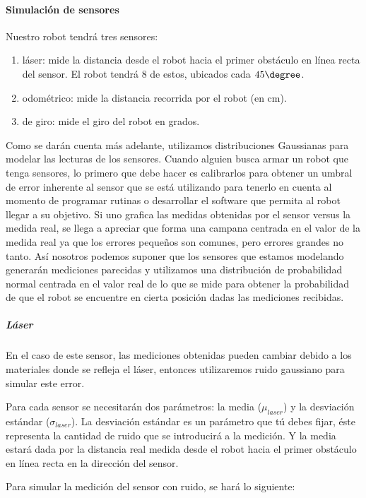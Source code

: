 \paragraph{Simulación de sensores}

\noindent Nuestro robot tendrá tres sensores:

\begin{enumerate}
  \item láser: mide la distancia desde el robot hacia el primer obstáculo en línea recta del sensor. El robot tendrá 8 de estos, ubicados cada \(45\degree\).
  \item odométrico: mide la distancia recorrida por el robot (en cm).
  \item de giro: mide el giro del robot en grados.
\end{enumerate}

Como se darán cuenta más adelante, utilizamos distribuciones Gaussianas para modelar las lecturas de los sensores. Cuando alguien busca armar un robot que tenga sensores, lo primero que debe hacer es calibrarlos para obtener un umbral de error inherente al sensor que se está utilizando para tenerlo en cuenta al momento de programar rutinas o desarrollar el software que permita al robot llegar a su objetivo. Si uno grafica las medidas obtenidas por el sensor versus la medida real, se llega a apreciar que forma una campana centrada en el valor de la medida real ya que los errores pequeños son comunes, pero errores grandes no tanto. Así nosotros podemos suponer que los sensores que estamos modelando generarán mediciones parecidas y utilizamos una distribución de probabilidad normal centrada en el valor real de lo que se mide para obtener la probabilidad de que el robot se encuentre en cierta posición dadas las mediciones recibidas.

\subparagraph{Láser}\medskip
En el caso de este sensor, las mediciones obtenidas pueden cambiar debido a los materiales donde se refleja el láser, entonces utilizaremos ruido gaussiano para simular este error.

Para cada sensor se necesitarán dos parámetros: la media (\( \mu_{laser} \)) y la desviación estándar (\( \sigma_{laser} \)). La desviación estándar es un parámetro que tú debes fijar, éste representa la cantidad de ruido que se introducirá a la medición. Y la media estará dada por la distancia real medida desde el robot hacia el primer obstáculo en línea recta en la dirección del sensor.

Para simular la medición del sensor con ruido, se hará lo siguiente:

